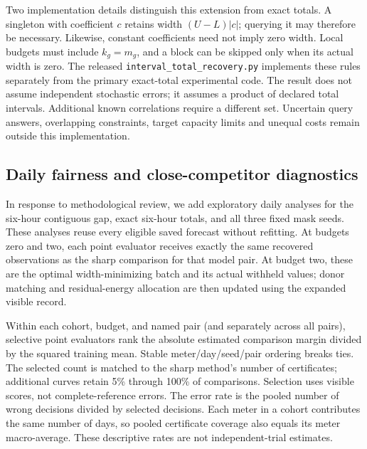 \documentclass[12pt]{article}
\begin{document}
Two implementation details distinguish this extension from exact totals.
A singleton with coefficient $c$ retains width $(U-L)|c|$; querying it
may therefore be necessary. Likewise, constant coefficients need not
imply zero width. Local budgets must include $k_g=m_g$, and a block
can be skipped only when its actual width is zero. The released
\texttt{interval\_total\_recovery.py} implements these rules separately
from the primary exact-total experimental code. The result does not
assume independent stochastic errors; it assumes a product of declared
total intervals. Additional known correlations require a different set.
Uncertain query answers, overlapping constraints, target capacity limits
and unequal costs remain outside this implementation.



\subsection{Daily fairness and close-competitor diagnostics}\label{app:fairness-design}
In response to methodological review, we add exploratory daily analyses for
the six-hour contiguous gap, exact six-hour totals, and all three fixed
mask seeds. These analyses reuse every eligible saved forecast without
refitting. At budgets zero and two, each point evaluator receives exactly
the same recovered observations as the sharp comparison for that model pair.
At budget two, these are the optimal width-minimizing batch and its actual
withheld values; donor matching and residual-energy allocation are then
updated using the expanded visible record.

Within each cohort, budget, and named pair (and separately across all pairs),
selective point evaluators rank the absolute estimated comparison margin
divided by the squared training mean. Stable meter/day/seed/pair ordering
breaks ties. The selected count is matched to the sharp method's number
of certificates; additional curves retain 5\% through 100\% of comparisons.
Selection uses visible scores, not complete-reference errors. The error
rate is the pooled number of wrong decisions divided by selected decisions.
Each meter in a cohort contributes the same number of days, so pooled
certificate coverage also equals its meter macro-average. These descriptive
rates are not independent-trial estimates.
\end{document}
